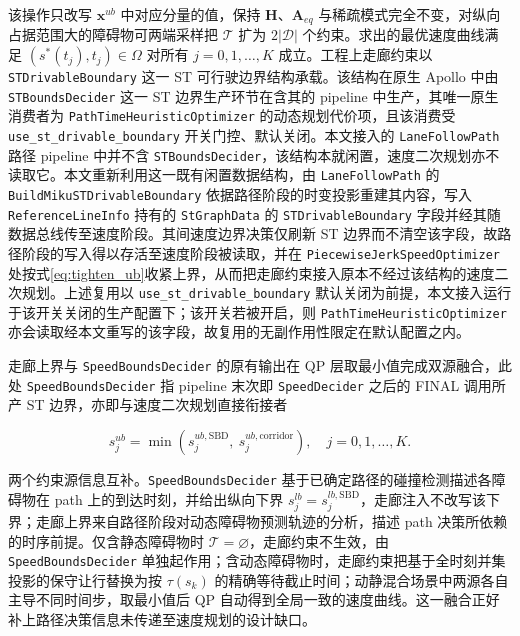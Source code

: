 \documentclass[a4paper,11pt]{ctexart}
\theoremstyle{definition}
\begin{document}
该操作只改写 $\mathbf{x}^{ub}$ 中对应分量的值，保持 $\mathbf{H}$、$\mathbf{A}_{eq}$ 与稀疏模式完全不变，对纵向占据范围大的障碍物可两端采样把 $\mathcal{T}$ 扩为 $2|\mathcal{D}|$ 个约束。求出的最优速度曲线满足 $(s^{*}(t_j), t_j) \in \Omega$ 对所有 $j=0,1,\ldots,K$ 成立。工程上走廊约束以 \texttt{STDrivableBoundary} 这一 ST 可行驶边界结构承载。该结构在原生 Apollo 中由 \texttt{STBoundsDecider} 这一 ST 边界生产环节在含其的 pipeline 中生产，其唯一原生消费者为 \texttt{PathTimeHeuristicOptimizer} 的动态规划代价项，且该消费受 \texttt{use\_st\_drivable\_boundary} 开关门控、默认关闭。本文接入的 \texttt{LaneFollowPath} 路径 pipeline 中并不含 \texttt{STBoundsDecider}，该结构本就闲置，速度二次规划亦不读取它。本文重新利用这一既有闲置数据结构，由 \texttt{LaneFollowPath} 的 \texttt{BuildMikuSTDrivableBoundary} 依据路径阶段的时变投影重建其内容，写入 \texttt{ReferenceLineInfo} 持有的 \texttt{StGraphData} 的 \texttt{STDrivableBoundary} 字段并经其随数据总线传至速度阶段。其间速度边界决策仅刷新 ST 边界而不清空该字段，故路径阶段的写入得以存活至速度阶段被读取，并在 \texttt{PiecewiseJerkSpeedOptimizer} 处按式\eqref{eq:tighten_ub}收紧上界，从而把走廊约束接入原本不经过该结构的速度二次规划。上述复用以 \texttt{use\_st\_drivable\_boundary} 默认关闭为前提，本文接入运行于该开关关闭的生产配置下；该开关若被开启，则 \texttt{PathTimeHeuristicOptimizer} 亦会读取经本文重写的该字段，故复用的无副作用性限定在默认配置之内。

走廊上界与 \texttt{SpeedBoundsDecider} 的原有输出在 QP 层取最小值完成双源融合，此处 \texttt{SpeedBoundsDecider} 指 pipeline 末次即 \texttt{SpeedDecider} 之后的 FINAL 调用所产 ST 边界，亦即与速度二次规划直接衔接者

\begin{equation}
    s_j^{ub} = \min\!\left(s_j^{ub,\mathrm{SBD}},\ s_j^{ub,\mathrm{corridor}}\right), \quad j = 0,1,\ldots,K.
    \label{eq:dual_source}
\end{equation}

两个约束源信息互补。\texttt{SpeedBoundsDecider} 基于已确定路径的碰撞检测描述各障碍物在 path 上的到达时刻，并给出纵向下界 $s_j^{lb}=s_j^{lb,\mathrm{SBD}}$，走廊注入不改写该下界；走廊上界来自路径阶段对动态障碍物预测轨迹的分析，描述 path 决策所依赖的时序前提。仅含静态障碍物时 $\mathcal{T}=\varnothing$，走廊约束不生效，由 \texttt{SpeedBoundsDecider} 单独起作用；含动态障碍物时，走廊约束把基于全时刻并集投影的保守让行替换为按 $\tau(s_k)$ 的精确等待截止时间；动静混合场景中两源各自主导不同时间步，取最小值后 QP 自动得到全局一致的速度曲线。这一融合正好补上路径决策信息未传递至速度规划的设计缺口。
\end{document}
